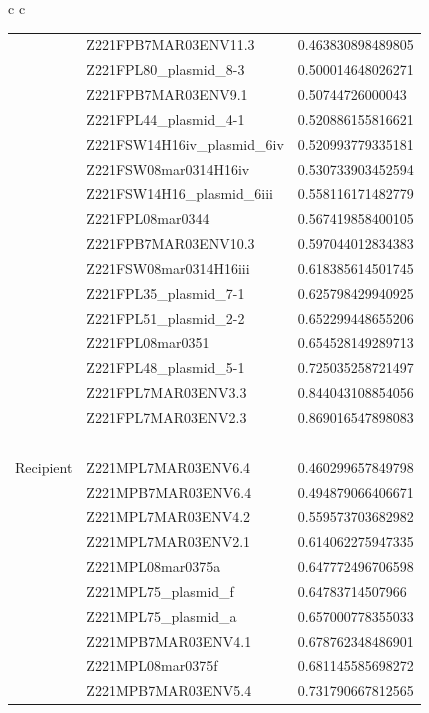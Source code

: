 \documentclass[conference]{IEEEtran}
\begin{document}
\begin{table}[]
\begin{tabular}{ c c}
\begin{tabular}{l l l}
&	Z221FPB7MAR03ENV11.3	&	0.463830898489805	\\
&	Z221FPL80\_plasmid\_8-3	&	0.500014648026271	\\
&	Z221FPB7MAR03ENV9.1	&	0.50744726000043	\\
&	Z221FPL44\_plasmid\_4-1	&	0.520886155816621	\\
&	Z221FSW14H16iv\_plasmid\_6iv	&	0.520993779335181	\\
&	Z221FSW08mar0314H16iv	&	0.530733903452594	\\
&	Z221FSW14H16\_plasmid\_6iii	&	0.558116171482779	\\
&	Z221FPL08mar0344	&	0.567419858400105	\\
&	Z221FPB7MAR03ENV10.3	&	0.597044012834383	\\
&	Z221FSW08mar0314H16iii	&	0.618385614501745	\\
&	Z221FPL35\_plasmid\_7-1	&	0.625798429940925	\\
&	Z221FPL51\_plasmid\_2-2	&	0.652299448655206	\\
&	Z221FPL08mar0351	&	0.654528149289713	\\
&	Z221FPL48\_plasmid\_5-1	&	0.725035258721497	\\
&	Z221FPL7MAR03ENV3.3	&	0.844043108854056	\\
&	Z221FPL7MAR03ENV2.3	&	0.869016547898083	\\

	& \ &\ \\
	\hline
Recipient &	Z221MPL7MAR03ENV6.4	&	0.460299657849798	\\
&	Z221MPB7MAR03ENV6.4	&	0.494879066406671	\\
&	Z221MPL7MAR03ENV4.2	&	0.559573703682982	\\
&	Z221MPL7MAR03ENV2.1	&	0.614062275947335	\\
&	Z221MPL08mar0375a	&	0.647772496706598	\\
&	Z221MPL75\_plasmid\_f	&	0.64783714507966	\\
&	Z221MPL75\_plasmid\_a	&	0.657000778355033	\\
&	Z221MPB7MAR03ENV4.1	&	0.678762348486901	\\
&	Z221MPL08mar0375f	&	0.681145585698272	\\
&	Z221MPB7MAR03ENV5.4	&	0.731790667812565	\\

\end{tabular}\\
\end{tabular}
\end{table}
\end{document}
